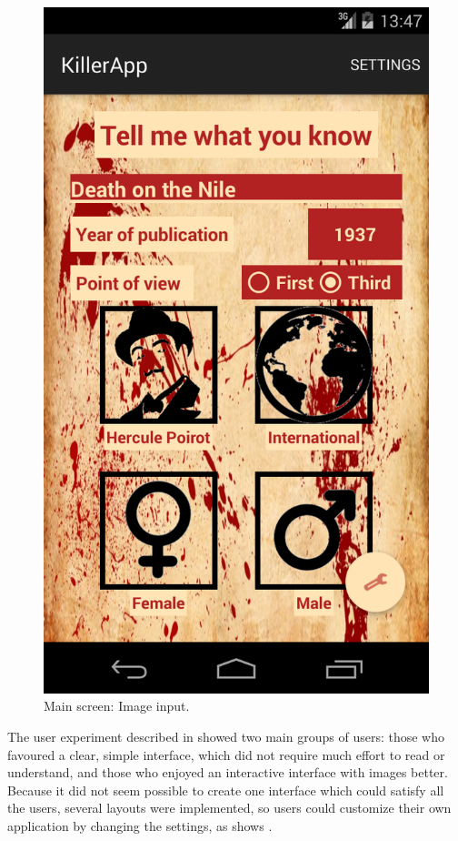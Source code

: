 \documentclass{mproj}
\begin{document}
\begin{figure}[h]
		\includegraphics[width=\linewidth]{images/image_input}
		\caption{Main screen: Image input.}	
		\label{fig:image_input}
	\endminipage
\end{figure}
The user experiment described in  showed two main groups of users: those who favoured a clear, simple interface, which did not require much effort to read or understand, and those who enjoyed an interactive interface with images better. Because it did not seem possible to create one interface which could satisfy all the users, several layouts were implemented, so users could customize their own application by changing the settings, as shows .
\end{document}
